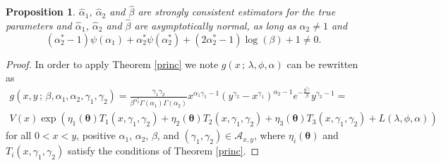 \documentclass[10pt,a4paper,onecolumn]{article} %
\newtheorem{proposition}[theorem]{Proposition}
\newcommand{\bs}{\boldsymbol}
\newcommand{\on}{\operatorname}
\begin{document}
\begin{proposition}\label{proofnotgamma} $\hat\alpha_{1}$, $\hat\alpha_{2}$ and $\hat\beta$ are strongly consistent estimators for the true parameters and $\hat{\alpha}_1$, $\hat{\alpha}_2$ and $\hat{\beta}$ are asymptotically normal, as long as $\alpha_2\neq 1$ and
\begin{equation*}
(\alpha_2^*-1)\psi(\alpha_1) + \alpha_2^*\psi(\alpha_2^*) + (2\alpha_2^*-1)\log(\beta) + 1\neq 0.
\end{equation*}
\end{proposition}
\begin{proof}


In order to apply Theorem \ref{princ}
 we note $g(x\,;\,\lambda,\phi,\alpha)$ can be rewritten as
 \begin{equation*}
 \begin{aligned}
g(x,y\,;\,\beta,\alpha_1,\alpha_2,\gamma_1,\gamma_2) = \frac{\gamma_1\gamma_2}{\beta^{\alpha^*_2} \Gamma(\alpha_1)\Gamma(\alpha_2)} x^{\alpha_1\gamma_1-1} \left(y^{\gamma_2} - x^{\gamma_1}\right)^{\alpha_2-1} e^{-\frac{y^{\gamma_2}}{\beta}} y^{\gamma_2 - 1}
=\\ V(x)\exp\left(\eta_1(\bs{\theta})T_1(x,\gamma_1,\gamma_2)+\eta_2(\bs{\theta})T_2(x,\gamma_1,\gamma_2)+\eta_3(\bs{\theta})T_3(x,\gamma_1,\gamma_2)+L(\lambda,\phi,\alpha)\right)
 \end{aligned}
 \end{equation*}
for all $0<x<y$, positive $\alpha_1$, $\alpha_2$, $\beta$, and $(\gamma_1,\gamma_2)\in \mathcal{A}_{x,y}$, where $\eta_i(\bs{\theta})$ and $T_i(x,\gamma_1,\gamma_2)$ satisfy the conditions of Theorem \ref{princ}.


\end{proof}
\end{document}
